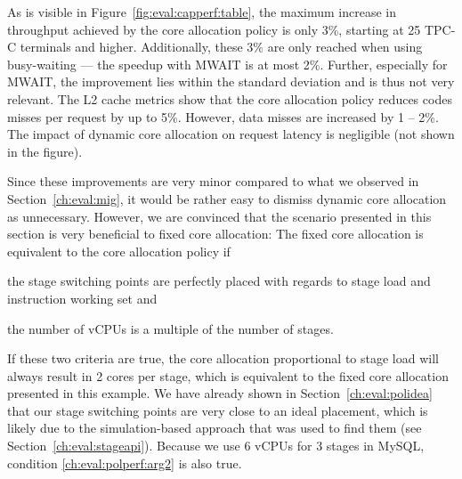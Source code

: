 \documentclass[12pt,a4paper]{book}
\begin{document}
As is visible in Figure~\ref{fig:eval:capperf:table}, the maximum increase in throughput achieved by the core allocation policy is only 3\%, starting at 25 TPC-C terminals and higher.
Additionally, these 3\% are only reached when using busy-waiting --- the speedup with MWAIT is at most 2\%.
Further, especially for MWAIT, the improvement lies within the standard deviation and is thus not very relevant.
The L2 cache metrics show that the core allocation policy reduces codes misses per request by up to 5\%.
However, data misses are increased by 1 -- 2\%.
The impact of dynamic core allocation on request latency is negligible (not shown in the figure).

Since these improvements are very minor compared to what we observed in Section~\ref{ch:eval:mig}, it would be rather easy to dismiss dynamic core allocation as unnecessary.
However, we are convinced that the scenario presented in this section is very beneficial to fixed core allocation:
The fixed core allocation is equivalent to the core allocation policy if
\begin{enumerate*}[label=(\alph*)]
    \item the stage switching points are perfectly placed with regards to stage load and instruction working set and \label{ch:eval:polperf:arg1}
    \item the number of vCPUs is a multiple of the number of stages. \label{ch:eval:polperf:arg2}
\end{enumerate*}
If these two criteria are true, the core allocation proportional to stage load will always result in 2 cores per stage, which is equivalent to the fixed core allocation presented in this example.
We have already shown in Section~\ref{ch:eval:polidea} that our stage switching points are very close to an ideal placement, which is likely due to the simulation-based approach that was used to find them (see Section~\ref{ch:eval:stageapi}).
Because we use 6 vCPUs for 3 stages in MySQL, condition \ref{ch:eval:polperf:arg2} is also true.
\end{document}
